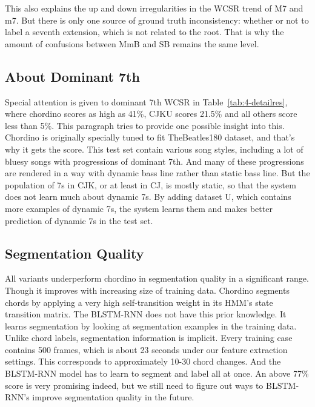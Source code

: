 This also explains the up and down irregularities in the WCSR trend of M7 and m7. But there is only one source of ground truth inconsistency: whether or not to label a seventh extension, which is not related to the root. That is why the amount of confusions between MmB and SB remains the same level.

\subsection{About Dominant 7th}
Special attention is given to dominant 7th WCSR in Table~\ref{tab:4-detailres}, where chordino scores as high as 41\%, CJKU scores 21.5\% and all others score less than 5\%. This paragraph tries to provide one possible insight into this. Chordino is originally specially tuned to fit TheBeatles180 dataset, and that's why it gets the score. This test set contain various song styles, including a lot of bluesy songs with progressions of dominant 7th. And many of these progressions are rendered in a way with dynamic bass line rather than static bass line. But the population of 7s in CJK, or at least in CJ, is mostly static, so that the system does not learn much about dynamic 7s. By adding dataset U, which contains more examples of dynamic 7s, the system learns them and makes better prediction of dynamic 7s in the test set.

\subsection{Segmentation Quality}
All variants underperform chordino in segmentation quality in a significant range. Though it improves with increasing size of training data. Chordino segments chords by applying a very high self-transition weight in its HMM's state transition matrix. The BLSTM-RNN does not have this prior knowledge. It learns segmentation by looking at segmentation examples in the training data. Unlike chord labels, segmentation information is implicit. Every training case contains 500 frames, which is about 23 seconds under our feature extraction settings. This corresponds to approximately 10-30 chord changes. And the BLSTM-RNN model has to learn to segment and label all at once. An above 77\% score is very promising indeed, but we still need to figure out ways to BLSTM-RNN's improve segmentation quality in the future.

